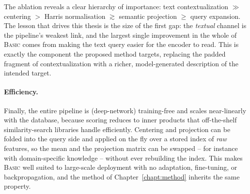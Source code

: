 The ablation reveals a clear hierarchy of importance:
text contextualization $\gg$ centering $>$ Harris normalisation
$\gtrsim$ semantic projection $\geq$ query expansion. The lesson that drives this
thesis is the size of the first gap: the \emph{textual} channel is the pipeline's
weakest link, and the largest single improvement in the whole of \textsc{Basic}
comes from making the text query easier for the encoder to read. This is exactly
the component the proposed method targets, replacing the padded fragment of
contextualization with a richer, model-generated description of the intended
target.

\paragraph{Efficiency.}
Finally, the entire pipeline is (deep-network) training-free and scales
near-linearly with the database, because scoring reduces to inner products that
off-the-shelf similarity-search libraries handle efficiently. Centering and
projection can be folded into the query side and applied on the fly over a stored
index of \emph{raw} features, so the mean and the projection matrix can be swapped
-- for instance with domain-specific knowledge -- without ever rebuilding the
index. This makes \textsc{Basic} well suited to large-scale deployment with no
adaptation, fine-tuning, or backpropagation, and the method of
Chapter~\ref{chapt:method} inherits the same property.
